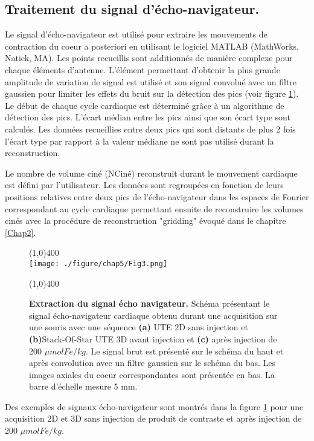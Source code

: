 \subsection{Traitement du signal d'écho-navigateur.}

Le signal d'écho-navigateur est utilisé pour extraire les mouvements de contraction du coeur a posteriori en utilisant le logiciel MATLAB (MathWorks, Natick, MA).  Les points recueillis sont additionnés de manière complexe pour chaque éléments d'antenne. L'élément permettant d'obtenir la plus grande amplitude de variation de signal est utilisé et son signal convolué avec un filtre gaussien pour limiter les effets du bruit sur la détection des pics (voir figure \ref{fig:Signal}). Le début de chaque cycle cardiaque est déterminé grâce à un algorithme de détection des pics.  L'écart médian entre les pics ainsi que son écart type sont calculés. Les données recueillies entre deux pics qui sont distants de plus 2 fois l'écart type par rapport à la valeur médiane ne sont pas utilisé durant la reconstruction.

Le nombre de volume ciné (NCiné) reconstruit durant le mouvement cardiaque est défini par l'utilisateur. Les données sont regroupées en fonction de leurs positions relatives entre deux pics de l'écho-navigateur dans les espaces de Fourier correspondant au cycle cardiaque permettant ensuite de reconstruire les volumes cinés avec la procédure de reconstruction "gridding" évoqué dans le chapitre \ref{Chap2}.

\begin{figure}[H]
\centering
\line(1,0){400} \\
\texttt{[image: ./figure/chap5/Fig3.png]}
\caption[Extraction du signal écho navigateur.]{\label{fig:Signal} \textbf{Extraction du signal écho navigateur.} Schéma présentant le signal écho-navigateur cardiaque obtenu durant une acquisition sur une souris avec une séquence \textbf{(a)} UTE 2D sans injection et \textbf{(b)}Stack-Of-Star UTE 3D avant injection et \textbf{(c)} après injection de 200 $\mu mol Fe/kg$. Le signal brut est présenté sur le schéma du haut et après convolution avec un filtre gaussien sur le schéma du bas. Les images axiales du coeur correspondantes sont présentée en bas. La barre d'échelle mesure 5 mm.}
\line(1,0){400} \\ 
\end{figure}

Des exemples de signaux écho-navigateur sont montrés dans la figure \ref{fig:Signal} pour une acquisition 2D et 3D sans injection de produit de contraste et après injection de 200 $\mu mol Fe/kg$. 

